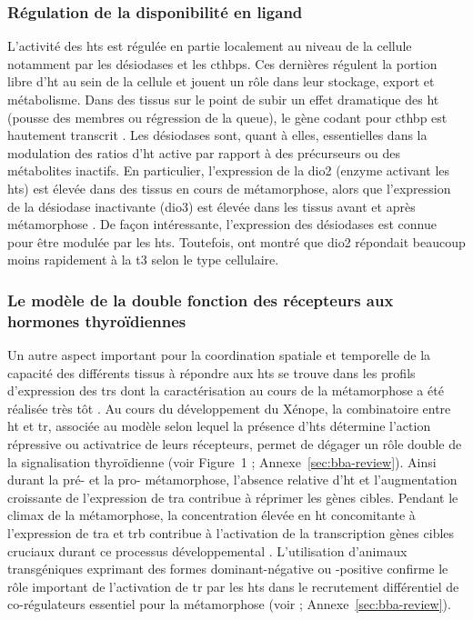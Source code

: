\documentclass[../main.tex]{subfiles}
\begin{document}
		\subsubsection{Régulation de la disponibilité en ligand}
			L'activité des \glspl{ht} est régulée en partie localement au niveau de la cellule notamment par les désiodases et les \glspl{cthbp}.
			Ces dernières régulent la portion libre d'\gls{ht} au sein de la cellule et jouent un rôle dans leur stockage, export et métabolisme.
			Dans des tissus sur le point de subir un effet dramatique des \gls{ht} (pousse des membres ou régression de la queue), le gène codant pour \gls{cthbp} est hautement transcrit \citep{Shi1994}.
			Les désiodases sont, quant à elles, essentielles dans la modulation des ratios d'\gls{ht} active par rapport à des précurseurs ou des métabolites inactifs.
			En particulier, l'expression de la \gls{dio2} (enzyme activant les \glspl{ht}) est élevée dans des tissus en cours de métamorphose, alors que l'expression de la désiodase inactivante (\gls{dio3}) est élevée dans les tissus avant et après métamorphose \citep{Leloup1981,Galton1989}.
			De façon intéressante, l'expression des désiodases est connue pour être modulée par les \glspl{ht}. Toutefois, \citet{Bonett2010} ont montré que \gls{dio2} répondait beaucoup moins rapidement à la \gls{t3} selon le type cellulaire.

		\subsubsection{Le modèle de la double fonction des récepteurs aux hormones thyroïdiennes}
			Un autre aspect important pour la coordination spatiale et temporelle de la capacité des différents tissus à répondre aux \glspl{ht} se trouve dans les profils d'expression des \glspl{tr} dont la caractérisation au cours de la métamorphose a été réalisée très tôt \citep{Yaoita1990}.
			Au cours du développement du Xénope, la combinatoire entre \gls{ht} et \gls{tr}, associée au modèle selon lequel la présence d'\glspl{ht} détermine l'action répressive ou activatrice de leurs récepteurs, permet de dégager un rôle double de la signalisation thyroïdienne (voir Figure~1 \citealp{Grimaldi2012}; Annexe~\ref{sec:bba-review}).
			Ainsi durant la pré- et la pro- métamorphose, l'absence relative d'\gls{ht} et l'augmentation croissante de l'expression de \gls{tra} contribue à réprimer les gènes cibles.
			Pendant le climax de la métamorphose, la concentration élevée en \gls{ht} concomitante à l'expression de \gls{tra} et \gls{trb} contribue à l'activation de la transcription gènes cibles cruciaux durant ce processus développemental \citep{Sachs2000}.
			L'utilisation d'animaux transgéniques exprimant des formes dominant-négative \citep{Schreiber2001,Buchholz2003} ou -positive \citep{Buchholz2004} confirme le rôle important de l'activation de \gls{tr} par les \glspl{ht} dans le recrutement différentiel de co-régulateurs essentiel pour la métamorphose (voir \citealp{Grimaldi2012}; Annexe~\ref{sec:bba-review}).
\end{document}
